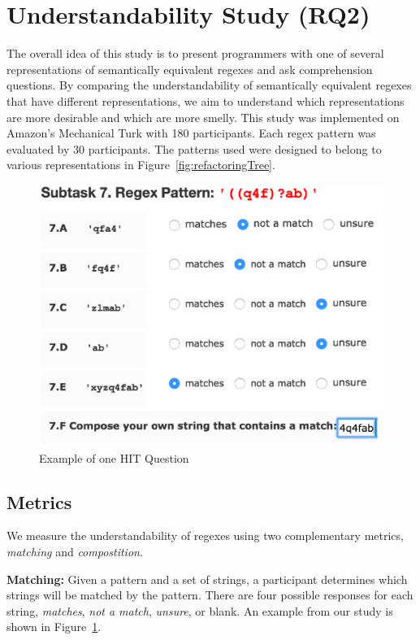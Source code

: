 \section{Understandability Study (RQ2)}
\label{sec:understandability}
The overall idea of this study  is to present  programmers with one of several representations of semantically equivalent regexes and ask comprehension questions. By comparing the understandability of semantically equivalent regexes that have different representations, we aim to understand which representations  are more desirable and which are more smelly.
This study was  implemented on Amazon's Mechanical Turk with 180 participants.  Each regex pattern was evaluated by 30 participants.
The patterns used were designed to belong to various representations in Figure~\ref{fig:refactoringTree}.

\begin{figure}[tb]
\centering
\includegraphics[width=0.8\columnwidth]{nontex/illustrations/exampleQuestion.eps}
\vspace{-12pt}
\caption{Example of one HIT Question}
\vspace{-6pt}
\label{fig:exampleQuestion}
\end{figure}



\subsection{Metrics}
\label{sec:understadningmetric}
We measure the understandability of regexes using two complementary metrics, \emph{matching} and \emph{compostition}.

\textbf{Matching:}
Given a pattern and a set of strings, a participant determines which strings will be matched by the pattern. There are four possible responses for each string, \emph{matches}, \emph{not a match}, \emph{unsure}, or blank. An example from our study is shown in Figure~\ref{fig:exampleQuestion}.

